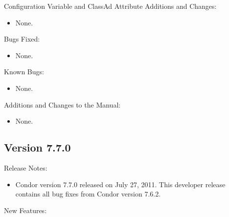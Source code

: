 \noindent Configuration Variable and ClassAd Attribute Additions and Changes:

\begin{itemize}

\item None.

\end{itemize}

\noindent Bugs Fixed:

\begin{itemize}

\item None.

\end{itemize}

\noindent Known Bugs:

\begin{itemize}

\item None.

\end{itemize}

\noindent Additions and Changes to the Manual:

\begin{itemize}

\item None.

\end{itemize}


\subsection*{\label{sec:New-7-7-0}Version 7.7.0}

\noindent Release Notes:

\begin{itemize}

\item Condor version 7.7.0 released on July 27, 2011.
This developer release contains all bug fixes from Condor version 7.6.2.

\end{itemize}


\noindent New Features:

